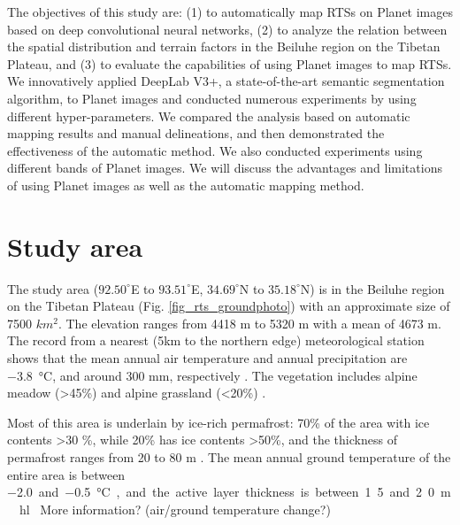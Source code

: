 \documentclass[preprint,12pt,authoryear]{elsarticle}
\begin{document}
The objectives of this study are: (1) to automatically map RTSs on Planet images based on deep convolutional neural networks, (2) to analyze the relation between the spatial distribution and terrain factors in the Beiluhe region on the Tibetan Plateau, and (3) to evaluate the capabilities of using Planet images to map RTSs. We innovatively applied DeepLab V3+, a state-of-the-art semantic segmentation algorithm, to Planet images and conducted numerous experiments by using different hyper-parameters. We compared the analysis based on automatic mapping results and manual delineations, and then demonstrated the effectiveness of the automatic method. We also conducted experiments using different bands of Planet images. We will discuss the advantages and limitations of using Planet images as well as the automatic mapping method.  %

\section{Study area}
\label{sec_studyarea}
The study area ($92.50^\circ$E to $93.51^\circ$E, $34.69^\circ$N to $35.18^\circ$N) is in the Beiluhe region on the Tibetan Plateau (Fig. \ref{fig_rts_groundphoto}) with an approximate size of 7500 $km^2$. The elevation ranges from 4418 m to 5320 m with a mean of 4673 m. The record from a nearest (5km to the northern edge) meteorological station shows that the mean annual air temperature and annual precipitation are \SI{-3.8}{\celsius}, and around 300 mm, respectively \citep{luo_thermokarst_2015}. The vegetation includes alpine meadow (\textgreater 45\%) and alpine grassland (\textless 20\%) \citep{luo_thermokarst_2015}. 

Most of this area is underlain by ice-rich permafrost: 70\% of the area with ice contents \textgreater 30 \%, while 20\% has ice contents \textgreater 50\%, and the thickness of permafrost ranges from 20 to 80 m \citep{zhou_geocryology_2000, luo_thermokarst_2015}. The mean annual ground temperature of the entire area is between \SI{-2.0} and \SI{-0.5}{\celsius}, and the active layer thickness is between 1.5 and 2.0 m \citep{zhou_geocryology_2000, luo_thermokarst_2015, wu2010changes, wu2015changes}. \hl{ More information? (air/ground temperature change?)}  %
\end{document}

